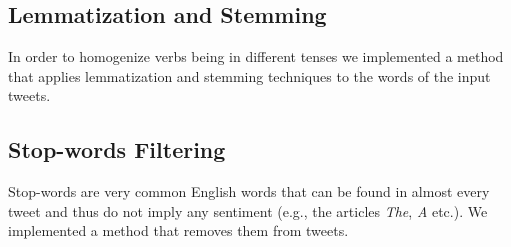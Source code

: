 \subsection{Lemmatization and Stemming}
In order to homogenize verbs being in different tenses we implemented a method that applies lemmatization and stemming techniques to the words of the input tweets.

\subsection{Stop-words Filtering}
Stop-words are very common English words that can be found in almost every tweet and thus do not imply any sentiment (e.g., the articles \textit{The}, \textit{A} etc.).
We implemented a method that removes them from tweets.

